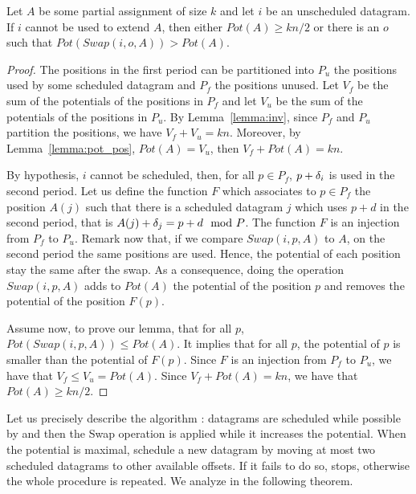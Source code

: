 \begin{lemma}\label{lemma:swap}
Let $A$ be some partial assignment of size $k$ and let $i$ be an unscheduled datagram. If $i$ cannot be used to extend $A$, then either $Pot(A) \geq kn/2$ or there is an $o$ such that $Pot(Swap(i,o,A)) > Pot(A)$.
\end{lemma}

\begin{proof}
The positions in the first period can be partitioned into $P_{u}$ the positions used by some scheduled datagram and $P_{f}$ the positions unused.
Let $V_f$ be the sum of the potentials of the positions in $P_f$ and let $V_u$ be the sum of the potentials of the positions in $P_u$. By Lemma~\ref{lemma:inv}, since $P_f$ and $P_u$ partition the positions, we have $V_f + V_u = kn$. Moreover, by Lemma~\ref{lemma:pot_pos}, $Pot(A) = V_u$, then $V_f + Pot(A) = kn$.

By hypothesis, $i$ cannot be scheduled, then, for all $p \in P_{f}$, $p+\delta_i$ is used in the second period. Let us define the function $F$ which associates to $p \in P_{f}$ the position $A(j)$ such that there is a scheduled datagram $j$ which uses $p+d$ in the second period, that is $A(j) + \delta_j = p + d \mod P$. The function $F$ is an injection from $P_{f}$ to $P_u$. Remark now that, if we compare $Swap(i,p,A)$ to $A$, on the second period the same positions are used. Hence, the potential of each position stay the same after the swap. As a consequence, doing the operation $Swap(i,p,A)$ adds to $Pot(A)$ the potential of the position $p$ and removes the potential of the position $F(p)$. 

Assume now, to prove our lemma, that for all $p$, $Pot(Swap(i,p,A)) \leq Pot(A)$. It implies that for all $p$, the potential of $p$ is smaller than the potential of $F(p)$. Since $F$ is an injection from $P_f$ to $P_u$, we have that $V_f \leq V_u = Pot(A)$. Since $V_f + Pot(A) = kn$, we have that $Pot(A) \geq kn/2$.
\end{proof}

Let us precisely describe the algorithm \swapandmove:  datagrams are scheduled while possible by \firstfit and then the Swap operation is applied while it increases the potential. When the potential is maximal, \swapandmove schedule a new datagram by moving at most two scheduled datagrams to other available offsets. If it fails to do so, \swapandmove stops, otherwise the whole procedure is repeated. We analyze \swapandmove in the following theorem.

